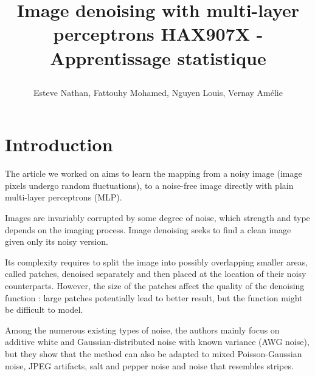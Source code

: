 \documentclass[10pt,a4paper]{article}
\author{Esteve Nathan, Fattouhy Mohamed, Nguyen Louis, Vernay Amélie}
\title{%
    \begin{minipage}\linewidth
        \centering
        Image denoising with multi-layer perceptrons
        \vskip3pt
        \large 
        HAX907X - Apprentissage statistique
    \end{minipage}
}
\newcommand{\svs}{\vspace{9pt}}
\begin{document}
\maketitle
\section{Introduction}

The article we worked on \citep{denoise} aims to learn the mapping from a noisy image (image pixels undergo random fluctuations), to a noise-free image directly with plain multi-layer perceptrons (MLP).

\svs

Images are invariably corrupted by some degree of noise, which strength and type depends on the imaging process. Image denoising seeks to find a clean image given only its noisy version.

\svs

Its complexity requires to split the image into possibly overlapping smaller areas, called patches, denoised separately and then placed at the location of their noisy counterparts. However, the size of the patches affect the quality of the denoising function : large patches potentially lead to better result, but the function might be difficult to model.

\svs

Among the numerous existing types of noise, the authors mainly focus on additive white and Gaussian-distributed noise with known variance (AWG noise), but they show that the method can also be adapted to mixed Poisson-Gaussian noise, JPEG artifacts, salt and pepper noise and noise that resembles stripes.

\svs



\end{document}
